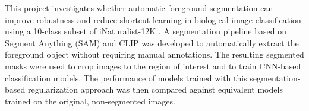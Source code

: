 \documentclass[sigconf, nonacm]{acmart}
\begin{document}
This project investigates whether automatic foreground segmentation can improve robustness and reduce shortcut learning in biological image classification using a 10-class subset of iNaturalist-12K \cite{inaturalist12k}.
A segmentation pipeline based on Segment Anything (SAM) \cite{sam_1,sam_2} and CLIP \cite{CLIP} was developed to automatically extract the foreground object without requiring manual annotations. The resulting segmented masks were used to crop images to the region of interest and to train CNN-based classification models. The performance of models trained with this segmentation-based regularization approach was then compared against equivalent models trained on the original, non-segmented images.
\end{document}
